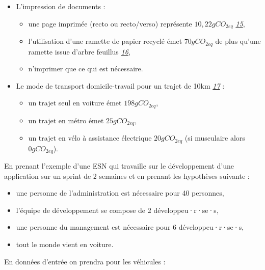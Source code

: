 \begin{itemize}
\tightlist
\item
  L'impression de documents :

  \begin{itemize}
  \tightlist
  \item
    une page imprimée (recto ou recto/verso) représente
    \(10,22 gCO_{2eq}\)
    \emph{\href{https://sites.google.com/site/pasdepapier/home/l-empreinte-carbone}{15}},
  \item
    l'utilisation d'une ramette de papier recyclé émet \(70 gCO_{2eq}\)
    de plus qu'une ramette issue d'arbre feuillus
    \emph{\href{https://www.bilans-ges.ademe.fr/documentation/UPLOAD_DOC_FR/index.htm?papier__carton_et_articles_en_.htm}{16}},
  \item
    n'imprimer que ce qui est nécessaire.
  \end{itemize}
\item
  Le mode de transport domicile-travail pour un trajet de 10km
  \emph{\href{https://monimpacttransport.fr/}{17}} :

  \begin{itemize}
  \tightlist
  \item
    un trajet seul en voiture émet \(198 gCO_{2eq}\),
  \item
    un trajet en métro émet \(25 gCO_{2eq}\),
  \item
    un trajet en vélo à assistance électrique \(20 gCO_{2eq}\) (si
    musculaire alors \(0 gCO_{2eq}\)).
  \end{itemize}
\end{itemize}

En prenant l'exemple d'une ESN qui travaille sur le développement d'une
application sur un sprint de 2 semaines et en prenant les hypothèses
suivante :

\begin{itemize}
\tightlist
\item
  une personne de l'administration est nécessaire pour 40 personnes,
\item
  l'équipe de développement se compose de 2 développeu·r·se·s,
\item
  une personne du management est nécessaire pour 6 développeu·r·se·s,
\item
  tout le monde vient en voiture.
\end{itemize}

En données d'entrée on prendra pour les véhicules :

